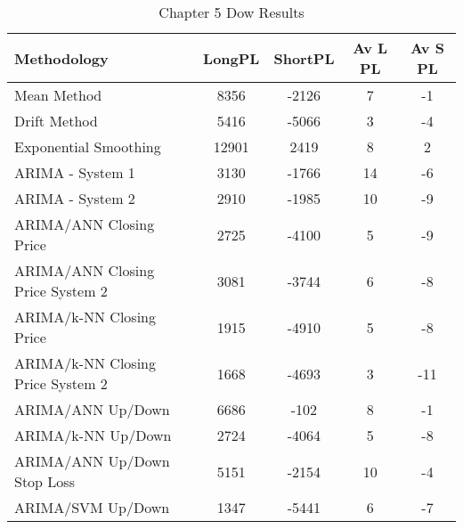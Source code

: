 \begin{table}[ht]
\centering
\caption[Chapter 5 Dow Results]{Chapter 5 Dow Results} 
\label{tab:chp6:dow2_summary}
\begin{tabular}{lcccc}
  \toprule Methodology & LongPL & ShortPL & Av L PL & Av S PL \\ 
  \midrule Mean Method & 8356 & -2126 & 7 & -1 \\ 
  Drift Method & 5416 & -5066 & 3 & -4 \\ 
  Exponential Smoothing & 12901 & 2419 & 8 & 2 \\ 
  ARIMA - System 1 & 3130 & -1766 & 14 & -6 \\ 
  ARIMA - System 2 & 2910 & -1985 & 10 & -9 \\ 
  ARIMA/ANN Closing Price & 2725 & -4100 & 5 & -9 \\ 
  ARIMA/ANN Closing Price System 2 & 3081 & -3744 & 6 & -8 \\ 
  ARIMA/k-NN Closing Price & 1915 & -4910 & 5 & -8 \\ 
  ARIMA/k-NN Closing Price System 2 & 1668 & -4693 & 3 & -11 \\ 
  ARIMA/ANN Up/Down & 6686 & -102 & 8 & -1 \\ 
  ARIMA/k-NN Up/Down & 2724 & -4064 & 5 & -8 \\ 
  ARIMA/ANN Up/Down Stop Loss & 5151 & -2154 & 10 & -4 \\ 
  ARIMA/SVM Up/Down & 1347 & -5441 & 6 & -7 \\ 
   \bottomrule \end{tabular}
\end{table}
